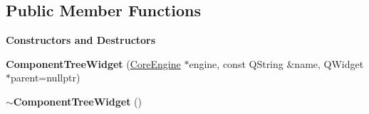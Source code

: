 \subsection*{Public Member Functions}
\begin{Indent}\textbf{ Constructors and Destructors}\par
\begin{DoxyCompactItemize}
\item 
\mbox{\label{classrev_1_1_view_1_1_component_tree_widget_acfb4c70ec9471b06e5def5f0c10f69d7}} 
{\bfseries Component\+Tree\+Widget} (\mbox{\hyperlink{classrev_1_1_core_engine}{Core\+Engine}} $\ast$engine, const Q\+String \&name, Q\+Widget $\ast$parent=nullptr)
\item 
\mbox{\label{classrev_1_1_view_1_1_component_tree_widget_aa91de3777cb7f3997ef6fdbd1fa317b4}} 
{\bfseries $\sim$\+Component\+Tree\+Widget} ()
\end{DoxyCompactItemize}
\end{Indent}
